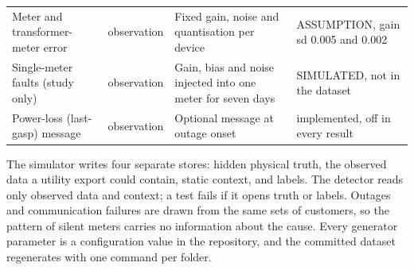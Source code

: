 \begin{table}[!t]
\begin{tabularx}{\textwidth}{@{}L{0.21\textwidth} L{0.09\textwidth} Y L{0.21\textwidth}@{}}
Meter and transformer-meter error & observation & Fixed gain, noise and quantisation per device & ASSUMPTION, gain sd 0.005 and 0.002 \\
Single-meter faults (study only) & observation & Gain, bias and noise injected into one meter for seven days & SIMULATED, not in the dataset \\
Power-loss (last-gasp) message & observation & Optional message at outage onset & implemented, off in every result \\
\bottomrule
\end{tabularx}
\end{table}

The simulator writes four separate stores: hidden physical truth, the observed data a utility export
could contain, static context, and labels. The detector reads only observed data and context; a test
fails if it opens truth or labels. Outages and communication failures are drawn from the same sets of
customers, so the pattern of silent meters carries no information about the cause. Every generator
parameter is a configuration value in the repository, and the committed dataset regenerates with one
command per folder.
